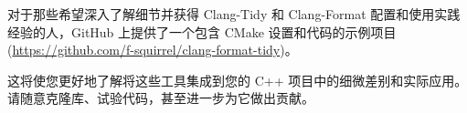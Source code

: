 对于那些希望深入了解细节并获得 Clang-Tidy 和 Clang-Format 配置和使用实践经验的人，GitHub 上提供了一个包含 CMake 设置和代码的示例项目 (\url{https://github.com/f-squirrel/clang-format-tidy})。

这将使您更好地了解将这些工具集成到您的 C++ 项目中的细微差别和实际应用。请随意克隆库、试验代码，甚至进一步为它做出贡献。
